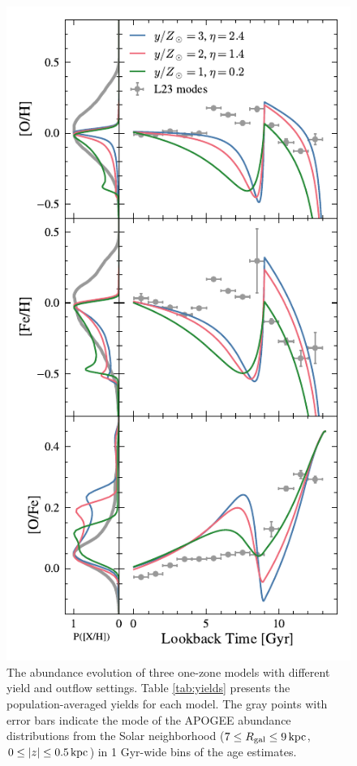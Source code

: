 \documentclass[twocolumn,twocolappendix,linenumbers]{aastex631}
\begin{document}
\begin{figure}
    \centering
    \includegraphics{figures/yield_outflow.pdf}
    \caption{The abundance evolution of three one-zone models with different yield and outflow settings. Table \ref{tab:yields} presents the population-averaged yields for each model. The gray points with error bars indicate the mode of the APOGEE abundance distributions from the Solar neighborhood ($7\leq R_{\rm gal}\leq 9\,{\rm kpc}$, $0\leq|z|\leq0.5\,{\rm kpc}$) in 1 Gyr-wide bins of the \citet{leung_variational_2023} age estimates.}
    \label{fig:yield-outflow}
\end{figure}
\end{document}
